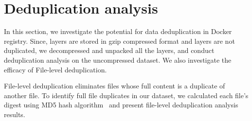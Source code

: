 \section{Deduplication analysis}
\label{sec:redundant_files}

In this section, we investigate the potential for data deduplication in Docker
registry.
%
Since, layers are stored in gzip compressed format and layers are not
duplicated, we decompressed and unpacked all the layers, and conduct
deduplication analysis on the uncompressed dataset.
%
%
We also investigate the efficacy of File-level deduplication.
%

File-level deduplication eliminates files whose full content is a duplicate of
another file.
%
To identify full file duplicates in our dataset, we calculated each file's
digest using MD5 hash algorithm~\cite{MD5} and present file-level deduplication
analysis results.



